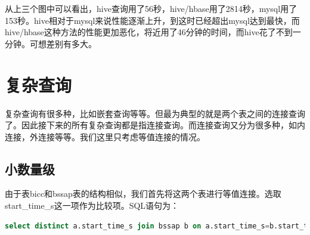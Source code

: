 从上三个图中可以看出，hive查询用了56秒，hive/hbase用了2814秒，mysql用了153秒。hive相对于mysql来说性能逐渐上升，到这时已经超出mysql达到最快，而hive/hbase这种方法的性能更加恶化，将近用了46分钟的时间，而hive花了不到一分钟。可想差别有多大。

\section{复杂查询}
复杂查询有很多种，比如嵌套查询等等。但最为典型的就是两个表之间的连接查询了。因此接下来的所有复杂查询都是指连接查询。而连接查询又分为很多种，如内连接，外连接等等。我们这里只考虑等值连接的情况。

\subsection{小数量级}
 由于表bicc和bssap表的结构相似，我们首先将这两个表进行等值连接。选取start\_time\_s这一项作为比较项。SQL语句为：
\begin{lstlisting}[language=SQL]
select distinct a.start_time_s join bssap b on a.start_time_s=b.start_time_s;
\end{lstlisting}

